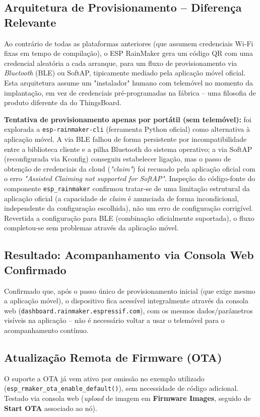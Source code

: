 \documentclass[a4paper,12pt]{article}
\begin{document}
\subsection{Arquitetura de Provisionamento -- Diferença Relevante}
Ao contrário de todas as plataformas anteriores (que assumem credenciais Wi-Fi fixas em tempo de compilação), o ESP RainMaker gera um código QR com uma credencial aleatória a cada arranque, para um fluxo de provisionamento via \textit{Bluetooth} (BLE) ou SoftAP, tipicamente mediado pela aplicação móvel oficial. Esta arquitetura assume um "instalador" humano com telemóvel no momento da implantação, em vez de credenciais pré-programadas na fábrica -- uma filosofia de produto diferente da do ThingsBoard.

\textbf{Tentativa de provisionamento apenas por portátil (sem telemóvel):} foi explorada a \texttt{esp-rainmaker-cli} (ferramenta Python oficial) como alternativa à aplicação móvel. A via BLE falhou de forma persistente por incompatibilidade entre a biblioteca cliente e a pilha Bluetooth do sistema operativo; a via SoftAP (reconfigurada via Kconfig) conseguiu estabelecer ligação, mas o passo de obtenção de credenciais da cloud (\textit{"claim"}) foi recusado pela aplicação oficial com o erro \textit{"Assisted Claiming not supported for SoftAP"}. Inspeção do código-fonte do componente \texttt{esp\_rainmaker} confirmou tratar-se de uma limitação estrutural da aplicação oficial (a capacidade de \textit{claim} é anunciada de forma incondicional, independente da configuração escolhida), não um erro de configuração corrigível. Revertida a configuração para BLE (combinação oficialmente suportada), o fluxo completou-se sem problemas através da aplicação móvel.

\subsection{Resultado: Acompanhamento via Consola Web Confirmado}
Confirmado que, após o passo único de provisionamento inicial (que exige mesmo a aplicação móvel), o dispositivo fica acessível integralmente através da consola web (\texttt{dashboard.rainmaker.espressif.com}), com os mesmos dados/parâmetros visíveis na aplicação -- não é necessário voltar a usar o telemóvel para o acompanhamento contínuo.

\subsection{Atualização Remota de Firmware (OTA)}
O suporte a OTA já vem ativo por omissão no exemplo utilizado (\texttt{esp\_rmaker\_ota\_enable\_default()}), sem necessidade de código adicional. Testado via consola web (\textit{upload} de imagem em \textbf{Firmware Images}, seguido de \textbf{Start OTA} associado ao nó).
\end{document}
